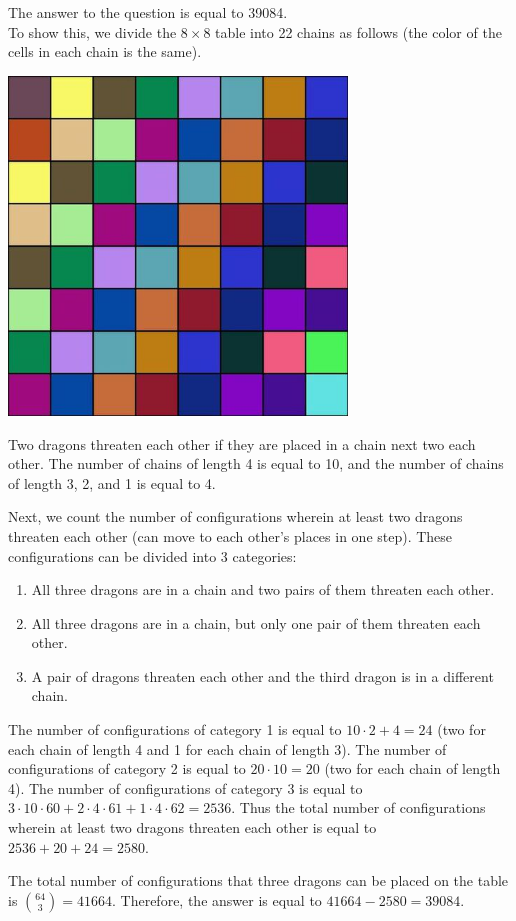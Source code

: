 \begin{solution}
The answer to the question is equal to 39084.\\[0.2cm]

To show this, we divide the $8 \times 8$ table into 22 chains as follows (the color of the cells in each chain is the same).

\begin{center}
	\includegraphics[width=9cm]{42/figs/42_diagram0.jpg}
\end{center}

Two dragons threaten each other if they are placed in a chain next two each other.
The number of chains of length 4 is equal to 10, and the number of chains of length 3, 2, and 1 is equal to 4.

Next, we count the number of configurations wherein at least two dragons threaten each other (can move to each other's places in one step). These configurations can be divided into 3 categories:

\begin{enumerate}
\item All three dragons are in a chain and two pairs of them threaten each other.
\item All three dragons are in a chain, but only one pair of them threaten each other.
\item A pair of dragons threaten each other and the third dragon is in a different chain.
\end{enumerate}

The number of configurations of category 1 is equal to $10 \cdot 2 + 4 = 24$ (two for each chain of length 4 and 1 for each chain of length 3).
The number of configurations of category 2 is equal to $20 \cdot 10 = 20$ (two for each chain of length 4).
The number of configurations of category 3 is equal to $3 \cdot 10 \cdot 60 + 2 \cdot 4 \cdot 61 + 1 \cdot 4 \cdot 62 = 2536$.
Thus the total number of configurations wherein at least two dragons threaten each other is equal to $2536 + 20 + 24 = 2580$.

The total number of configurations that three dragons can be placed on the table is $\binom{64}{3} = 41664$.
Therefore, the answer is equal to $41664 - 2580 = 39084$.
\end{solution}